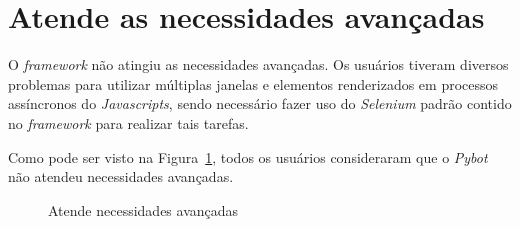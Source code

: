     \section{Atende as necessidades avançadas}
        O \textit{framework} não atingiu as necessidades avançadas. Os usuários tiveram diversos problemas para utilizar múltiplas janelas e elementos renderizados em
        processos assíncronos do \textit{Java\textit{scripts}}, sendo necessário fazer uso do \textit{Selenium} padrão contido no \textit{framework} para realizar tais tarefas.

          Como pode ser visto na Figura~\ref{fig:avancado}, todos os usuários consideraram que o \textit{Pybot} não atendeu necessidades avançadas.

        \begin{figure}[H]
            \vspace*{0,2cm}
            \centering
            \caption{Atende necessidades avançadas}
            \label{fig:avancado}
        \end{figure}
